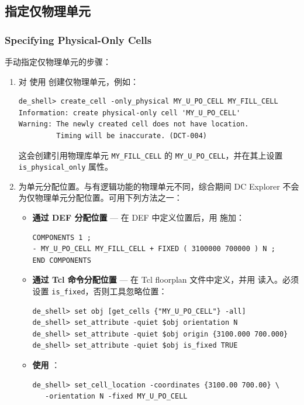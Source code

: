 \subsection{指定仅物理单元}
\subsubsection*{Specifying Physical-Only Cells}

手动指定仅物理单元的步骤：
\begin{enumerate}
  \item 对  使用  创建仅物理单元，例如：
\begin{lstlisting}
de_shell> create_cell -only_physical MY_U_PO_CELL MY_FILL_CELL
Information: create physical-only cell 'MY_U_PO_CELL'
Warning: The newly created cell does not have location.
         Timing will be inaccurate. (DCT-004)
\end{lstlisting}
        这会创建引用物理库单元 \texttt{MY\_FILL\_CELL} 的 \texttt{MY\_U\_PO\_CELL}，并在其上设置 \texttt{is\_physical\_only} 属性。
  \item 为单元分配位置。与有逻辑功能的物理单元不同，综合期间 DC Explorer 不会为仅物理单元分配位置。可用下列方法之一：
  \begin{itemize}
    \item \textbf{通过 DEF 分配位置} — 在 DEF 中定义位置后，用  施加：
\begin{lstlisting}
COMPONENTS 1 ;
- MY_U_PO_CELL MY_FILL_CELL + FIXED ( 3100000 700000 ) N ;
END COMPONENTS
\end{lstlisting}
    \item \textbf{通过 Tcl 命令分配位置} — 在 Tcl floorplan 文件中定义，并用  读入。必须设置 \texttt{is\_fixed}，否则工具忽略位置：
\begin{lstlisting}
de_shell> set obj [get_cells {"MY_U_PO_CELL"} -all]
de_shell> set_attribute -quiet $obj orientation N
de_shell> set_attribute -quiet $obj origin {3100.000 700.000}
de_shell> set_attribute -quiet $obj is_fixed TRUE
\end{lstlisting}
    \item \textbf{使用 }：
\begin{lstlisting}
de_shell> set_cell_location -coordinates {3100.00 700.00} \
   -orientation N -fixed MY_U_PO_CELL
\end{lstlisting}
  \end{itemize}
\end{enumerate}

